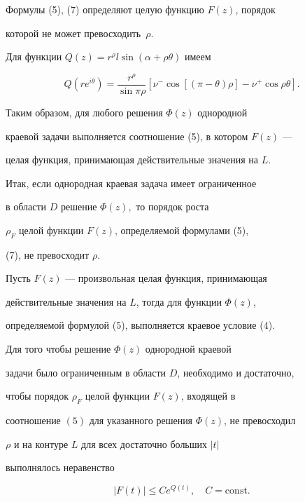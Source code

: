 Формулы (5), (7) определяют целую функцию $F(z)$, порядок


которой не может превосходить~$\rho.$





Для функции $ Q(z)=r^{\rho}l\sin(\alpha+\rho\theta)$ имеем


\begin{equation}


Q(re^{i\theta})=\frac{r^{\rho}}{\sin\pi\rho}[\nu^{-}\cos[(\pi-


\theta)\rho]-\nu^{+}\cos\rho\theta].


\end{equation}





Таким образом, для любого решения $\Phi (z)$ однородной


краевой задачи выполняется соотношение (5), в котором $F(z)$ ---


целая функция, принимающая действительные значения на $L.$


Итак, если однородная краевая задача имеет ограниченное


в области $D$ решение $\Phi (z),$ то порядок роста


$\rho_F$ целой функции $F(z)$, определяемой формулами (5),


(7), не превосходит $\rho.$





Пусть $F(z)$ --- произвольная целая функция,  принимающая


действительные значения на $L$, тогда для функции $\Phi (z)$,


определяемой формулой (5), выполняется краевое условие (4).





\begin{thm}


Для того чтобы решение $\Phi (z)$ однородной краевой


задачи было ограниченным в области $D$, необходимо и достаточно,


чтобы порядок $\rho_F$ целой функции $F(z)$, входящей в


соотношение $(5)$ для указанного решения $\Phi (z)$, не превосходил


$\rho$ и на контуре $L$ для всех достаточно больших $|t|$


выполнялось неравенство


\begin{equation}


|F(t)|\leq Ce^{Q(t)},\quad C=\mathrm{const}.


\end{equation}


\end{thm}





